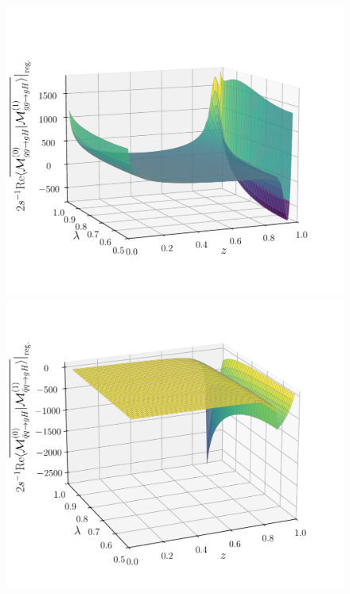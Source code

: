 \begin{figure}[ht]
  \begin{minipage}[t]{0.49\textwidth}
  \centering
  \includegraphics[width=\textwidth]{Images/RV_amplitudes/tOStOS_gg.pdf}
  \end{minipage}
  \begin{minipage}[t]{0.49\textwidth}
  \centering
  \includegraphics[width=\textwidth]{Images/RV_amplitudes/tOStOS_qBq.pdf}

\end{minipage}
\end{figure}
